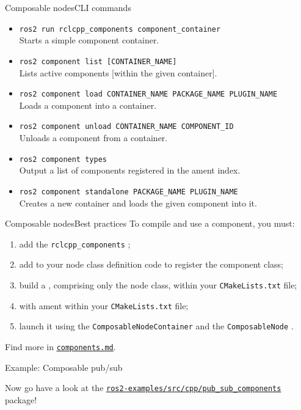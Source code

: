 \begin{frame}{Composable nodes}{CLI commands}
  \begin{itemize}
		\item \texttt{ros2 run rclcpp\_components component\_container}\\Starts a simple component container.
		\item \texttt{ros2 component list [CONTAINER\_NAME]}\\Lists active components [within the given container].
		\item \texttt{ros2 component load CONTAINER\_NAME PACKAGE\_NAME PLUGIN\_NAME}\\Loads a component into a container.
		\item \texttt{ros2 component unload CONTAINER\_NAME COMPONENT\_ID}\\Unloads a component from a container.
		\item \texttt{ros2 component types}\\Output a list of components registered in the ament index.
		\item \texttt{ros2 component standalone PACKAGE\_NAME PLUGIN\_NAME}\\Creates a new container and loads the given component into it.
	\end{itemize}
\end{frame}
\begin{frame}{Composable nodes}{Best practices}
  To compile and use a component, you must:
  \begin{enumerate}
    \item add the \texttt{rclcpp\_components} ;
    \item add  to your node class definition code to register the component class;
    \item build a , comprising only the node class, within your \texttt{CMakeLists.txt} file;
    \item {} with ament within your \texttt{CMakeLists.txt} file;
    \item launch it using the \texttt{ComposableNodeContainer}  and the \texttt{ComposableNode} .
  \end{enumerate}
  \begin{block}{}
		\centering
		Find more in \href{https://github.com/IntelligentSystemsLabUTV/ros2-examples/blob/humble/components.md}{\color{blue}\underline{\texttt{components.md}}}.
	\end{block}
\end{frame}

\begin{frame}{Example: Composable pub/sub}
  \begin{block}{}
    \centering
	  Now go have a look at the \href{https://github.com/IntelligentSystemsLabUTV/ros2-examples/tree/humble/src/cpp/pub_sub_components}{\color{blue}\underline{\texttt{ros2-examples/src/cpp/pub\_sub\_components}}} package!
  \end{block}
\end{frame}
